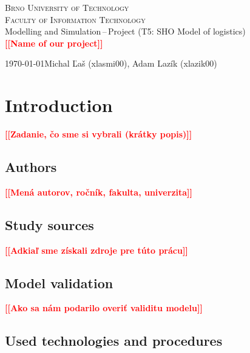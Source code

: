 \documentclass[a4paper, 11pt, a4paper]{article}
\newcommand{\todo}[1]{\textcolor{red}{\textbf{[[#1]]}}}
\begin{document}
\begin{titlepage}
    \begin{center}
            \textsc{\Huge Brno University of Technology \\}
            \vspace{0.5em}
            \textsc{\huge Faculty of Information Technology \\}
            {\LARGE 	Modelling and Simulation\,--\,Project (T5: SHO Model of logistics) \\ 
            \vspace{0.4em}
            \Huge \todo{Name of our project}}
    \end{center}
    {\Large \today \hfill Michal Ľaš (xlasmi00), Adam Lazík (xlazik00)}
\end{titlepage}

\tableofcontents
\newpage

\section{Introduction}

\noindent\todo{Zadanie, čo sme si vybrali (krátky popis)\cite{placeholder.cite}}


\subsection{Authors}

\noindent\todo{Mená autorov, ročník, fakulta, univerzita}


\subsection{Study sources}

\noindent\todo{Adkiaľ sme získali zdroje pre túto prácu}


\subsection{Model validation}

\noindent\todo{Ako sa nám podarilo overiť validitu modelu}


\subsection{Used technologies and procedures}
\end{document}
